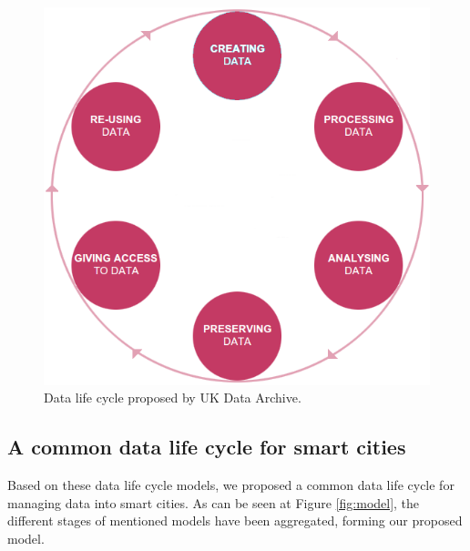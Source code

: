 \begin{figure}
    \center
    \includegraphics[scale=0.4]{img/data_lifecycle/uk-data-archive.png}
    \caption{Data life cycle proposed by UK Data Archive.}
    \label{fig:uk-data-archive}
\end{figure}

\subsection{A common data life cycle for smart cities}

Based on these data life cycle models, we proposed a common data life cycle for managing data into smart cities. As can be seen at Figure \ref{fig:model}, the different stages of mentioned models have been aggregated, forming our proposed model.


